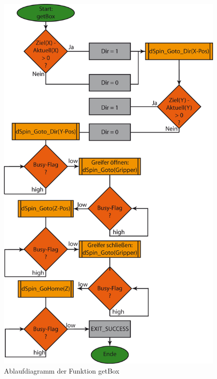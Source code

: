 \begin{figure}[h]
\includegraphics[scale = 0.8]{./getBox.png}
\hspace{-14pt}
\caption{Ablaufdiagramm der Funktion getBox}
\end{figure} 

